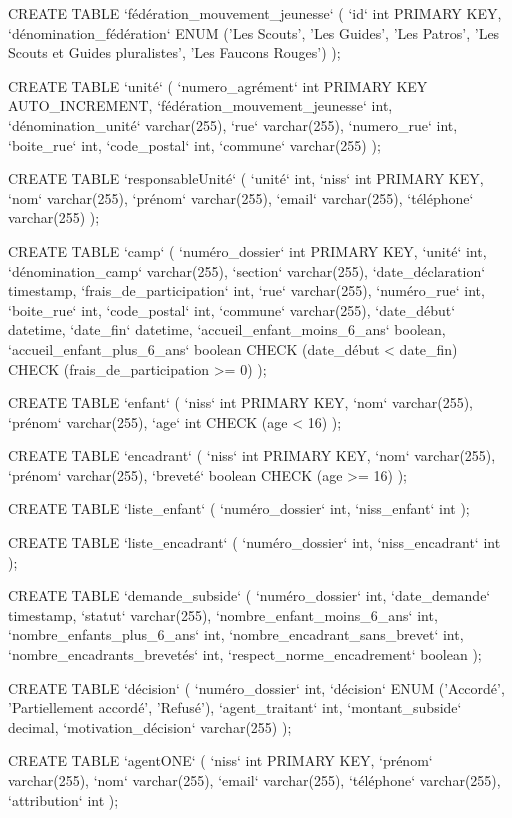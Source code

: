 CREATE TABLE `fédération_mouvement_jeunesse` (
  `id` int PRIMARY KEY,
  `dénomination_fédération` ENUM ('Les Scouts', 
                                'Les Guides', 
                                'Les Patros', 
                                'Les Scouts et Guides pluralistes', 
                                'Les Faucons Rouges')
);

CREATE TABLE `unité` (
  `numero_agrément` int PRIMARY KEY AUTO_INCREMENT,
  `fédération_mouvement_jeunesse` int,
  `dénomination_unité` varchar(255),
  `rue` varchar(255),
  `numero_rue` int,
  `boite_rue` int,
  `code_postal` int,
  `commune` varchar(255)
);

CREATE TABLE `responsableUnité` (
  `unité` int,
  `niss` int PRIMARY KEY,
  `nom` varchar(255),
  `prénom` varchar(255),
  `email` varchar(255),
  `téléphone` varchar(255)
);

CREATE TABLE `camp` (
  `numéro_dossier` int PRIMARY KEY,
  `unité` int,
  `dénomination_camp` varchar(255),
  `section` varchar(255),
  `date_déclaration` timestamp,
  `frais_de_participation` int,
  `rue` varchar(255),
  `numéro_rue` int,
  `boite_rue` int,
  `code_postal` int,
  `commune` varchar(255),
  `date_début` datetime,
  `date_fin` datetime,
  `accueil_enfant_moins_6_ans` boolean,
  `accueil_enfant_plus_6_ans` boolean
  CHECK (date_début < date_fin)
  CHECK (frais_de_participation >= 0)
);

CREATE TABLE `enfant` (
  `niss` int PRIMARY KEY,
  `nom` varchar(255),
  `prénom` varchar(255),
  `age` int
  CHECK (age < 16)
);

CREATE TABLE `encadrant` (
  `niss` int PRIMARY KEY,
  `nom` varchar(255),
  `prénom` varchar(255),
  `breveté` boolean
  CHECK (age >= 16)
);

CREATE TABLE `liste_enfant` (
  `numéro_dossier` int,
  `niss_enfant` int
);

CREATE TABLE `liste_encadrant` (
  `numéro_dossier` int,
  `niss_encadrant` int
);

CREATE TABLE `demande_subside` (
  `numéro_dossier` int,
  `date_demande` timestamp,
  `statut` varchar(255),
  `nombre_enfant_moins_6_ans` int,
  `nombre_enfants_plus_6_ans` int,
  `nombre_encadrant_sans_brevet` int,
  `nombre_encadrants_brevetés` int,
  `respect_norme_encadrement` boolean
);

CREATE TABLE `décision` (
  `numéro_dossier` int,
  `décision` ENUM ('Accordé', 'Partiellement accordé', 'Refusé'),
  `agent_traitant` int,
  `montant_subside` decimal,
  `motivation_décision` varchar(255)
);

CREATE TABLE `agentONE` (
  `niss` int PRIMARY KEY,
  `prénom` varchar(255),
  `nom` varchar(255),
  `email` varchar(255),
  `téléphone` varchar(255),
  `attribution` int
);


